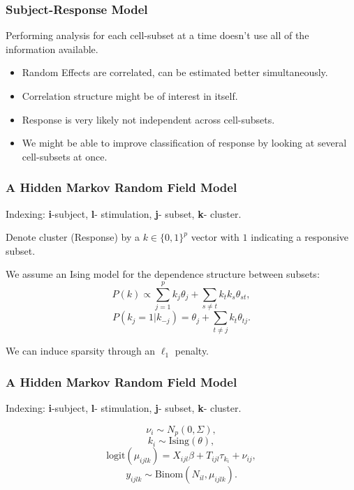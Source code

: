 \documentclass{beamer}
\theoremstyle{definition}
\begin{document}

\begin{frame}
\frametitle{Subject-Response Model}
Performing analysis for each cell-subset at a time doesn't use all of the information available.
\pause
\vspace{0.3 cm} 
\begin{itemize}
\item Random Effects are correlated, can be estimated better simultaneously.
\vspace{0.3 cm}
\item Correlation structure might be of interest in itself. 
\pause
\vspace{0.3 cm}
\item Response is very likely not independent across cell-subsets.
\vspace{0.3 cm}
\item We might be able to improve classification of response by looking at several cell-subsets at once.  
\end{itemize}
\end{frame}


\begin{frame}
\frametitle{A Hidden Markov Random Field Model}
\begin{framed}
Indexing: \textbf{i}-subject, \textbf{l}- stimulation, \textbf{j}- subset, \textbf{k}- cluster.
\end{framed}

Denote cluster (Response) by a $k \in \{0,1\}^{p}$ vector with $1$ indicating a responsive subset.
\pause
\vspace{0.3 cm}

We assume an Ising model for the dependence structure between subsets:
$$
P(k) \propto \sum_{j=1}^{p} k_{j} \theta_j + \sum_{s\neq t} k_{t} k_{s} \theta_{st},
$$$$
P(k_{j} = 1| k_{-j}) = \theta_{j} + \sum_{t\neq j } k_{t} \theta_{tj}.
$$

\pause
\vspace{0.3 cm}
We can induce sparsity through an $\ell_1$ penalty.

\end{frame}


\begin{frame}
\frametitle{A Hidden Markov Random Field Model}
\begin{framed}
Indexing: \textbf{i}-subject, \textbf{l}- stimulation, \textbf{j}- subset, \textbf{k}- cluster.
\end{framed}

\vspace{0.3 cm}

$$
\nu_i \sim N_p(0, \Sigma),
$$$$
k_i \sim \text{Ising}(\theta),
$$$$
\text{logit}(\mu_{ijlk}) = X_{ijl} \beta + T_{ijl}\tau_{k_i} + \nu_{ij} ,
$$$$
y_{ijlk} \sim \text{Binom}(N_{il}, \mu_{ijlk}).
$$
\end{frame}
\end{document}
